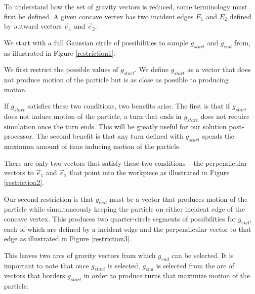 To understand how the set of gravity vectors is reduced, some terminology must first be defined. A given concave vertex has two incident edges $E_1$ and $E_2$ defined by outward vectors $\vec{e}_1$ and $\vec{e}_2$.


We start with a full Gaussian circle of possibilities to sample $g_{start}$ and $g_{end}$ from, as illustrated in Figure \ref{restriction1}.


We first restrict the possible values of $g_{start}$. We define $g_{start}$ as a vector that does not produce motion of the particle but is as close as possible to producing motion.

If $g_{start}$ satisfies these two conditions, two benefits arise. The first is that if $g_{start}$ does not induce motion of the particle, a turn that ends in $g_{start}$ does not require simulation once the turn ends. This will be greatly useful for our solution post-processor. The second benefit is that any turn defined with $g_{start}$ spends the maximum amount of time inducing motion of the particle.

There are only two vectors that satisfy these two conditions -- the perpendicular vectors to $\vec{e}_1$ and $\vec{e}_2$ that point into the workpiece as illustrated in Figure \ref{restriction2}.


Our second restriction is that $g_{end}$ must be a vector that produces motion of the particle while simultaneously keeping the particle on either incident edge of the concave vertex. This produces two quarter-circle segments of possibilities for $g_{end}$, each of which are defined by a incident edge and the perpendicular vector to that edge as illustrated in Figure \ref{restriction3}.



This leaves two arcs of gravity vectors from which $g_{end}$ can be selected. It is important to note that once $g_{start}$ is selected, $g_{end}$ is selected from the arc of vectors that borders $g_{start}$ in order to produce turns that maximize motion of the particle.

